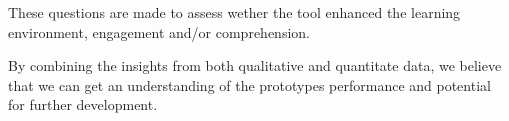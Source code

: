 These questions are made to assess wether the tool enhanced the learning environment, engagement and/or comprehension.

By combining the insights from both qualitative and quantitate data, we believe that we can get an understanding of the prototypes performance and potential for further development.



